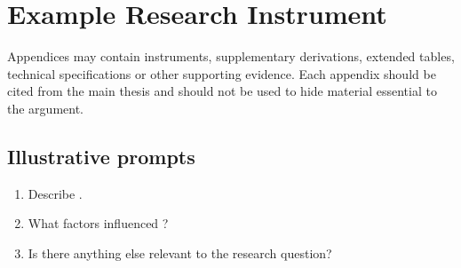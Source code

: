 \chapter{Example Research Instrument}
\label{app:instrument}


Appendices may contain instruments, supplementary derivations, extended tables,
technical specifications or other supporting evidence. Each appendix should be cited
from the main thesis and should not be used to hide material essential to the argument.

\section{Illustrative prompts}
\begin{enumerate}
  \item Describe .
  \item What factors influenced ?
  \item Is there anything else relevant to the research question?
\end{enumerate}

